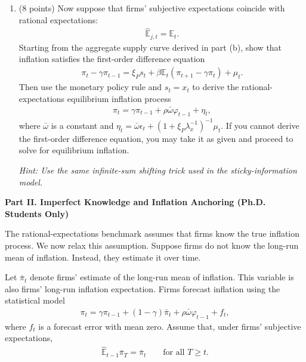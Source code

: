 \documentclass[12pt]{article}
\begin{document}
\begin{enumerate}[label=\arabic*.]
\begin{enumerate}[label=(\alph*)]
        \item (8 points)
        Now suppose that firms' subjective expectations coincide with rational expectations:
        \begin{align*}
            \hat{\mathbb{E}}_{j,t}=\mathbb{E}_t.
        \end{align*}
        Starting from the aggregate supply curve derived in part (b), show that inflation satisfies the first-order difference equation
        \begin{align*}
            \pi_t-\gamma\pi_{t-1}
            =
            \xi_P s_t
            +
            \beta\mathbb{E}_t(\pi_{t+1}-\gamma\pi_t)
            +
            \mu_t.
        \end{align*}
        Then use the monetary policy rule and $s_t=x_t$ to derive the rational-expectations equilibrium inflation process
        \begin{align*}
            \pi_t
            =
            \gamma\pi_{t-1}
            +
            \rho\bar{\omega}\varphi_{t-1}
            +
            \eta_t,
        \end{align*}
        where $\bar{\omega}$ is a constant and $\eta_t = \bar{\omega}\epsilon_t + (1+\xi_P\lambda_x^{-1})^{-1}\mu_t$.
        If you cannot derive the first-order difference equation, you may take it as given and proceed to solve for equilibrium inflation.
    
        \textit{Hint: Use the same infinite-sum shifting trick used in the sticky-information model.}
    \end{enumerate}

    \textbf{Part II. Imperfect Knowledge and Inflation Anchoring (Ph.D. Students Only)}

    The rational-expectations benchmark assumes that firms know the true inflation process. We now relax this assumption. Suppose firms do not know the long-run mean of inflation. Instead, they estimate it over time.

    Let $\bar{\pi}_t$ denote firms' estimate of the long-run mean of inflation. This variable is also firms' long-run inflation expectation. Firms forecast inflation using the statistical model
    \begin{align*}
        \pi_t
        =
        \gamma\pi_{t-1}
        +
        (1-\gamma)\bar{\pi}_t
        +
        \rho\bar{\omega}\varphi_{t-1}
        +
        f_t,
    \end{align*}
    where $f_t$ is a forecast error with mean zero. Assume that, under firms' subjective expectations,
    \begin{align*}
        \hat{\mathbb{E}}_{t-1}\bar{\pi}_T=\bar{\pi}_t
        \qquad
        \text{for all } T\geq t.
    \end{align*}
    

\end{enumerate}
\end{document}
